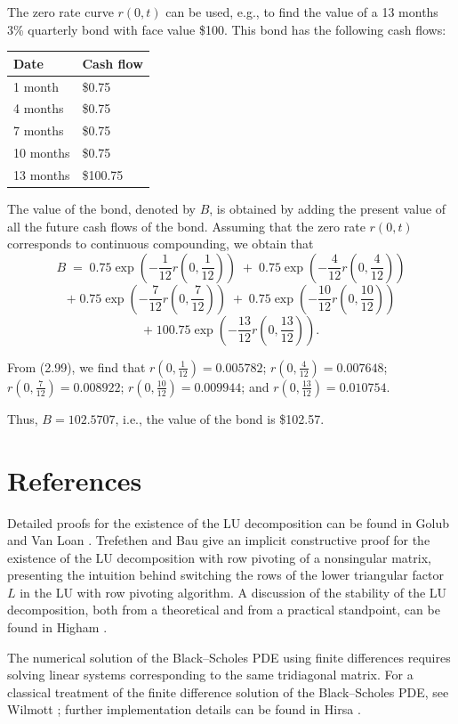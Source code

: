 The zero rate curve $r(0,t)$ can be used, e.g., to find the value of a 13 months
3\% quarterly bond with face value \$100. This bond has the following cash flows:

\begin{center}
\begin{tabular}{|l|l|}
\hline
Date & Cash flow \\
\hline
1 month & \$0.75 \\
\hline
4 months & \$0.75 \\
\hline
7 months & \$0.75 \\
\hline
10 months & \$0.75 \\
\hline
13 months & \$100.75 \\
\hline
\end{tabular}
\end{center}

The value of the bond, denoted by $B$, is obtained by adding the present value of
all the future cash flows of the bond. Assuming that the zero rate $r(0,t)$
corresponds to continuous compounding, we obtain that
\[
B \;=\; 0.75\exp\left(-\frac1{12}r\left(0,\frac1{12}\right)\right) \;+\;
0.75\exp\left(-\frac4{12}r\left(0,\frac4{12}\right)\right)
\]
\[
+\; 0.75\exp\left(-\frac7{12}r\left(0,\frac7{12}\right)\right) \;+\;
0.75\exp\left(-\frac{10}{12}r\left(0,\frac{10}{12}\right)\right)
\]
\[
+\; 100.75\exp\left(-\frac{13}{12}r\left(0,\frac{13}{12}\right)\right).
\]

From (2.99), we find that $r\left(0,\frac1{12}\right)=0.005782$;
$r\left(0,\frac4{12}\right)=0.007648$; $r\left(0,\frac7{12}\right)=0.008922$;
$r\left(0,\frac{10}{12}\right)=0.009944$; and
$r\left(0,\frac{13}{12}\right)=0.010754$.

Thus, $B=102.5707$, i.e., the value of the bond is \$102.57.

\section{References}

Detailed proofs for the existence of the LU decomposition can be found in Golub
and Van Loan \cite{18}. Trefethen and Bau \cite{43} give an implicit constructive
proof for the existence of the LU decomposition with row pivoting of a
nonsingular matrix, presenting the intuition behind switching the rows of the
lower triangular factor $L$ in the LU with row pivoting algorithm. A discussion of
the stability of the LU decomposition, both from a theoretical and from a
practical standpoint, can be found in Higham \cite{20}.

The numerical solution of the Black--Scholes PDE using finite differences requires
solving linear systems corresponding to the same tridiagonal matrix. For a
classical treatment of the finite difference solution of the Black--Scholes PDE,
see Wilmott \cite{46}; further implementation details can be found in Hirsa
\cite{21}.
